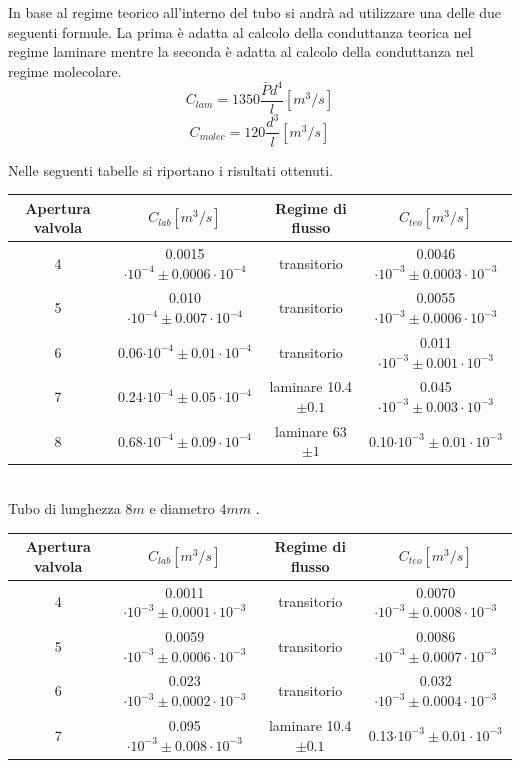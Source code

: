 \documentclass[a4paper,11pt]{article}
\begin{document}
In base al regime teorico all'interno del tubo si andrà ad utilizzare una delle due seguenti formule. La prima è adatta al calcolo della conduttanza teorica nel regime laminare mentre la seconda è adatta al calcolo della conduttanza nel regime molecolare.
$$C_{lam}=1350\frac{\bar{P}d^4}{l}[m^3/s]$$
$$C_{molec}=120\frac{d^3}{l}[m^3/s]$$
 
Nelle seguenti tabelle si riportano i risultati ottenuti.\\
 

\begin{center} 
\begin{tabular}{|c|c|c|c|}
\hline Apertura valvola & $C_{lab} [m^3/s]$ & Regime di flusso & $C_{teo} [m^3/s]$ \\ 
\hline 4 & 0.0015 $\cdot10^{-4}\pm 0.0006\cdot10^{-4}$ & transitorio & 0.0046$\cdot10^{-3}\pm 0.0003\cdot10^{-3}$ \\ 
\hline 5 & 0.010$\cdot10^{-4}\pm 0.007\cdot10^{-4}$ & transitorio & 0.0055$\cdot10^{-3}\pm 0.0006\cdot10^{-3}$ \\ 
\hline 6 & 0.06$\cdot10^{-4}\pm 0.01\cdot10^{-4}$ & transitorio & 0.011$\cdot10^{-3}\pm 0.001\cdot10^{-3}$ \\
\hline 7 & 0.24$\cdot10^{-4}\pm 0.05\cdot10^{-4}$ & laminare 10.4$\pm0.1$ & 0.045$\cdot10^{-3}\pm 0.003\cdot10^{-3}$ \\
\hline 8 & 0.68$\cdot10^{-4}\pm 0.09\cdot10^{-4}$ & laminare 63$\pm1$ & 0.10$\cdot10^{-3}\pm 0.01\cdot10^{-3}$ \\ 
\hline 
\end{tabular}\\
\vspace{3pt}
Tubo di lunghezza $8m$ e diametro $4mm$ .
\\
\vspace{10pt}
\begin{tabular}{|c|c|c|c|}
\hline Apertura valvola & $C_{lab} [m^3/s]$ & Regime di flusso & $C_{teo} [m^3/s]$ \\ 
\hline 4 & 0.0011$\cdot10^{-3}\pm 0.0001\cdot10^{-3}$ & transitorio & 0.0070$\cdot10^{-3}\pm 0.0008\cdot10^{-3}$ \\ 
\hline 5 & 0.0059$\cdot10^{-3}\pm 0.0006\cdot10^{-3}$ & transitorio & 0.0086$\cdot10^{-3}\pm 0.0007\cdot10^{-3}$ \\ 
\hline 6 & 0.023$\cdot10^{-3}\pm 0.0002\cdot10^{-3}$ & transitorio & 0.032$\cdot10^{-3}\pm 0.0004\cdot10^{-3}$ \\
\hline 7 & 0.095$\cdot10^{-3}\pm 0.008\cdot10^{-3}$ & laminare 10.4$\pm0.1$ & 0.13$\cdot10^{-3}\pm 0.01\cdot10^{-3}$ \\

\end{tabular}
\end{center}
\end{document}
